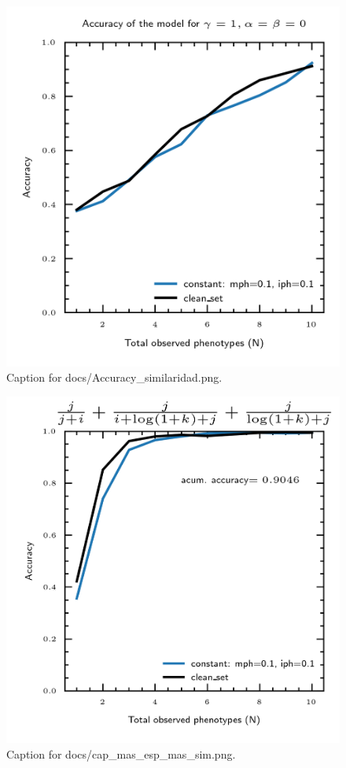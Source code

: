 \documentclass{article}
\begin{document}
\begin{figure}[h] \centering \includegraphics{docs/Accuracy_similaridad.png} \caption{Caption for docs/Accuracy_similaridad.png.} \end{figure}
\begin{figure}[h] \centering \includegraphics{docs/cap_mas_esp_mas_sim.png} \caption{Caption for docs/cap_mas_esp_mas_sim.png.} \end{figure}
\end{document}
